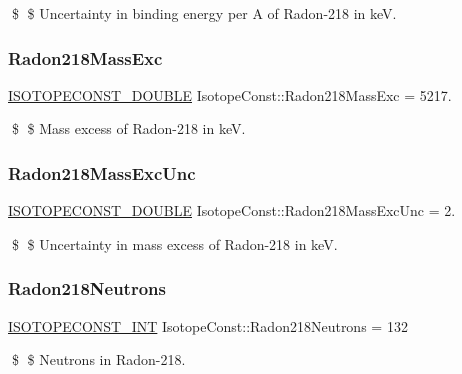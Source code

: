 \$ \$ Uncertainty in binding energy per A of Radon-\/218 in keV. \mbox{\label{group___isotope_const-_radon-_rn218_ga1b5eb87cde5568e442b2321ee7f0afd2}} 
\subsubsection{\texorpdfstring{Radon218\+Mass\+Exc}{Radon218MassExc}}
{\footnotesize\ttfamily \mbox{\hyperlink{group___isotope_const-_macros_ga8f45a7272ce02c0b4c65c44636ed719a}{I\+S\+O\+T\+O\+P\+E\+C\+O\+N\+S\+T\+\_\+\+D\+O\+U\+B\+LE}} Isotope\+Const\+::\+Radon218\+Mass\+Exc = 5217.}

\$ \$ Mass excess of Radon-\/218 in keV. \mbox{\label{group___isotope_const-_radon-_rn218_ga9ae96ba2fde07fae91bc70f34bf155be}} 
\subsubsection{\texorpdfstring{Radon218\+Mass\+Exc\+Unc}{Radon218MassExcUnc}}
{\footnotesize\ttfamily \mbox{\hyperlink{group___isotope_const-_macros_ga8f45a7272ce02c0b4c65c44636ed719a}{I\+S\+O\+T\+O\+P\+E\+C\+O\+N\+S\+T\+\_\+\+D\+O\+U\+B\+LE}} Isotope\+Const\+::\+Radon218\+Mass\+Exc\+Unc = 2.}

\$ \$ Uncertainty in mass excess of Radon-\/218 in keV. \mbox{\label{group___isotope_const-_radon-_rn218_gafbe7d523f6eef456225e49f2b5b5a7e1}} 
\subsubsection{\texorpdfstring{Radon218\+Neutrons}{Radon218Neutrons}}
{\footnotesize\ttfamily \mbox{\hyperlink{group___isotope_const-_macros_ga5f18360b3e99483a35c32d789e62621c}{I\+S\+O\+T\+O\+P\+E\+C\+O\+N\+S\+T\+\_\+\+I\+NT}} Isotope\+Const\+::\+Radon218\+Neutrons = 132}

\$ \$ Neutrons in Radon-\/218. \mbox{\label{group___isotope_const-_radon-_rn218_ga87cea8d43352e4d33544b15cebc3e837}} 
